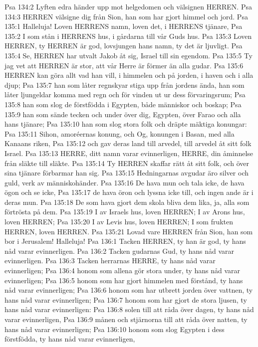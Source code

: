 Psa 134:2  Lyften edra händer upp mot helgedomen och välsignen HERREN.
Psa 134:3  HERREN välsigne dig från Sion, han som har gjort himmel och jord.
Psa 135:1  Halleluja! Loven HERRENS namn, loven det, i HERRENS tjänare,
Psa 135:2  I som stån i HERRENS hus, i gårdarna till vår Guds hus.
Psa 135:3  Loven HERREN, ty HERREN är god, lovsjungen hans namn, ty det är ljuvligt.
Psa 135:4  Se, HERREN har utvalt Jakob åt sig, Israel till sin egendom.
Psa 135:5  Ty jag vet att HERREN är stor, att vår Herre är förmer än alla gudar.
Psa 135:6  HERREN kan göra allt vad han vill, i himmelen och på jorden, i haven och i alla djup;
Psa 135:7  han som låter regnskyar stiga upp från jordens ända, han som låter ljungeldar komma med regn och för vinden ut ur dess förvaringsrum;
Psa 135:8  han som slog de förstfödda i Egypten, både människor och boskap;
Psa 135:9  han som sände tecken och under över dig, Egypten, över Farao och alla hans tjänare;
Psa 135:10  han som slog stora folk och dräpte mäktiga konungar:
Psa 135:11  Sihon, amoréernas konung, och Og, konungen i Basan, med alla Kanaans riken,
Psa 135:12  och gav deras land till arvedel, till arvedel åt sitt folk Israel.
Psa 135:13  HERRE, ditt namn varar evinnerligen, HERRE, din åminnelse från släkte till släkte.
Psa 135:14  Ty HERREN skaffar rätt åt sitt folk, och över sina tjänare förbarmar han sig.
Psa 135:15  Hedningarnas avgudar äro silver och guld, verk av människohänder.
Psa 135:16  De hava mun och tala icke, de hava ögon och se icke,
Psa 135:17  de hava öron och lyssna icke till, och ingen ande är i deras mun.
Psa 135:18  De som hava gjort dem skola bliva dem lika, ja, alla som förtrösta på dem.
Psa 135:19  I av Israels hus, loven HERREN; I av Arons hus, loven HERREN;
Psa 135:20  I av Levis hus, loven HERREN; I som frukten HERREN, loven HERREN.
Psa 135:21  Lovad vare HERREN från Sion, han som bor i Jerusalem! Halleluja!
Psa 136:1  Tacken HERREN, ty han är god, ty hans nåd varar evinnerligen.
Psa 136:2  Tacken gudarnas Gud, ty hans nåd varar evinnerligen.
Psa 136:3  Tacken herrarnas HERRE, ty hans nåd varar evinnerligen;
Psa 136:4  honom som allena gör stora under, ty hans nåd varar evinnerligen;
Psa 136:5  honom som har gjort himmelen med förstånd, ty hans nåd varar evinnerligen;
Psa 136:6  honom som har utbrett jorden över vattnen, ty hans nåd varar evinnerligen;
Psa 136:7  honom som har gjort de stora ljusen, ty hans nåd varar evinnerligen:
Psa 136:8  solen till att råda över dagen, ty hans nåd varar evinnerligen,
Psa 136:9  månen och stjärnorna till att råda över natten, ty hans nåd varar evinnerligen;
Psa 136:10  honom som slog Egypten i dess förstfödda, ty hans nåd varar evinnerligen,
